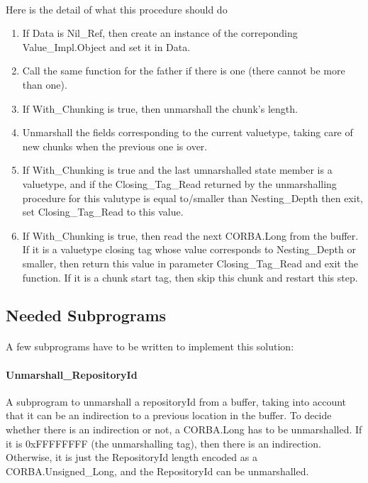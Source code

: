 \paragraph{}Here is the detail of what this procedure should do
\begin{enumerate}
\item If Data is Nil\_Ref, then create an instance of the correponding
  Value\_Impl.Object and set it in Data.
\item Call the same function for the father if there is one (there
cannot be more than one).
\item If With\_Chunking is true, then unmarshall the chunk's length.
\item Unmarshall the fields corresponding to the current valuetype,
taking care of new chunks when the previous one is over.
\item If With\_Chunking is true and the last umnarshalled state member
is a valuetype, and if the Closing\_Tag\_Read returned by the
unmarshalling procedure for this valutype is equal to/smaller than
Nesting\_Depth then exit, set Closing\_Tag\_Read to this value.
\item If With\_Chunking is true, then read the next CORBA.Long from
the buffer. If it is a valuetype closing tag whose value corresponds
to Nesting\_Depth or smaller, then return this value in parameter
Closing\_Tag\_Read and exit the function. If it is a chunk start tag,
then skip this chunk and restart this step.
\end{enumerate}

\subsection{Needed Subprograms}

\paragraph{} A few subprograms have to be written to implement this solution:

\paragraph{Unmarshall\_RepositoryId} A subprogram to unmarshall a
repositoryId from a buffer, taking into account that it can be an
indirection to a previous location in the buffer. To decide whether
there is an indirection or not, a CORBA.Long has to be
unmarshalled. If it is 0xFFFFFFFF (the unmarshalling tag), then there
is an indirection. Otherwise, it is just the RepositoryId length
encoded as a CORBA.Unsigned\_Long, and the RepositoryId can be unmarshalled.

